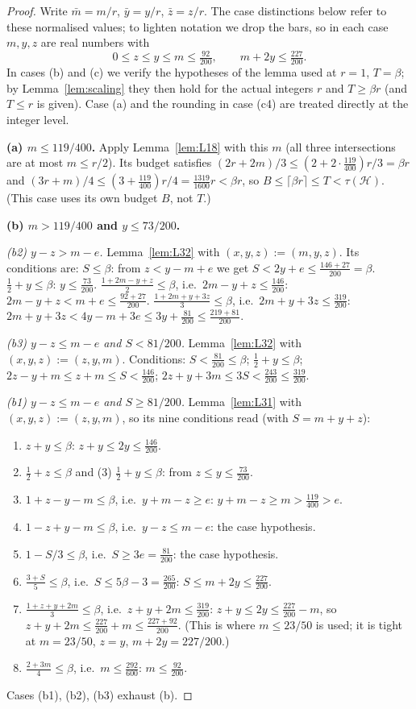 \documentclass[11pt]{amsart}
\theoremstyle{definition}
\theoremstyle{remark}
\newcommand{\cH}{\mathcal H}
\newcommand{\ceil}[1]{\lceil #1\rceil}
\begin{document}
\begin{proof}
Write $\bar m=m/r$, $\bar y=y/r$, $\bar z=z/r$. The case distinctions below refer to these normalised values; to lighten notation we drop the bars, so in each case $m,y,z$ are real numbers with
\[
0\le z\le y\le m\le\tfrac{92}{200},\qquad m+2y\le\tfrac{227}{200}. \tag{R}
\]
In cases (b) and (c) we verify the hypotheses of the lemma used at $r=1$, $T=\beta$; by Lemma~\ref{lem:scaling} they then hold for the actual integers $r$ and $T\ge\beta r$ (and $T\le r$ is given). Case (a) and the rounding in case (c4) are treated directly at the integer level.

\medskip\noindent\textbf{(a) $m\le119/400$.} Apply Lemma~\ref{lem:L18} with this $m$ (all three intersections are at most $m\le r/2$). Its budget satisfies $(2r+2m)/3\le(2+2\cdot\tfrac{119}{400})r/3=\beta r$ and $(3r+m)/4\le(3+\tfrac{119}{400})r/4=\tfrac{1319}{1600}r<\beta r$, so $B\le\ceil{\beta r}\le T<\tau(\cH)$. (This case uses its own budget $B$, not $T$.)

\medskip\noindent\textbf{(b) $m>119/400$ and $y\le73/200$.}

\emph{(b2) $y-z>m-e$.} Lemma~\ref{lem:L32} with $(x,y,z):=(m,y,z)$. Its conditions are: $S\le\beta$: from $z<y-m+e$ we get $S<2y+e\le\tfrac{146+27}{200}=\beta$. $\tfrac12+y\le\beta$: $y\le\tfrac{73}{200}$. $\tfrac{1+2m-y+z}{2}\le\beta$, i.e.\ $2m-y+z\le\tfrac{146}{200}$: $2m-y+z<m+e\le\tfrac{92+27}{200}$. $\tfrac{1+2m+y+3z}{3}\le\beta$, i.e.\ $2m+y+3z\le\tfrac{319}{200}$: $2m+y+3z<4y-m+3e\le3y+\tfrac{81}{200}\le\tfrac{219+81}{200}$.

\emph{(b3) $y-z\le m-e$ and $S<81/200$.} Lemma~\ref{lem:L32} with $(x,y,z):=(z,y,m)$. Conditions: $S<\tfrac{81}{200}\le\beta$; $\tfrac12+y\le\beta$; $2z-y+m\le z+m\le S<\tfrac{146}{200}$; $2z+y+3m\le3S<\tfrac{243}{200}\le\tfrac{319}{200}$.

\emph{(b1) $y-z\le m-e$ and $S\ge81/200$.} Lemma~\ref{lem:L31} with $(x,y,z):=(z,y,m)$, so its nine conditions read (with $S=m+y+z$):
\begin{enumerate}
\item $z+y\le\beta$: $z+y\le2y\le\tfrac{146}{200}$.
\item $\tfrac12+z\le\beta$ and (3) $\tfrac12+y\le\beta$: from $z\le y\le\tfrac{73}{200}$.
\setcounter{enumi}{3}
\item $1+z-y-m\le\beta$, i.e.\ $y+m-z\ge e$: $y+m-z\ge m>\tfrac{119}{400}>e$.
\item $1-z+y-m\le\beta$, i.e.\ $y-z\le m-e$: the case hypothesis.
\item $1-S/3\le\beta$, i.e.\ $S\ge3e=\tfrac{81}{200}$: the case hypothesis.
\item $\tfrac{3+S}{5}\le\beta$, i.e.\ $S\le5\beta-3=\tfrac{265}{200}$: $S\le m+2y\le\tfrac{227}{200}$.
\item $\tfrac{1+z+y+2m}{3}\le\beta$, i.e.\ $z+y+2m\le\tfrac{319}{200}$: $z+y\le2y\le\tfrac{227}{200}-m$, so $z+y+2m\le\tfrac{227}{200}+m\le\tfrac{227+92}{200}$. (This is where $m\le23/50$ is used; it is tight at $m=23/50$, $z=y$, $m+2y=227/200$.)
\item $\tfrac{2+3m}{4}\le\beta$, i.e.\ $m\le\tfrac{292}{600}$: $m\le\tfrac{92}{200}$.
\end{enumerate}
Cases (b1), (b2), (b3) exhaust (b).


\end{proof}
\end{document}
